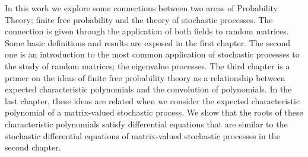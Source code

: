 In this work we explore some connections between two areas of Probability Theory; finite free probability and the theory of stochastic processes. The connection is given through the application of both fields to random matrices. Some basic definitions and results are exposed in the first chapter. The second one is an introduction to the most common application of stochastic processes to the study of random matrices; the eigenvalue processes. The third chapter is a primer on the ideas of finite free probability theory as a relationship between expected characteristic polynomials and the convolution of polynomials. In the last chapter, these ideas are related when we consider the expected characteristic polynomial of a matrix-valued stochastic process. We show that the roots of these characteristic polynomials satisfy differential equations that are similar to the stochastic differential equations of matrix-valued stochastic processes in the second chapter.